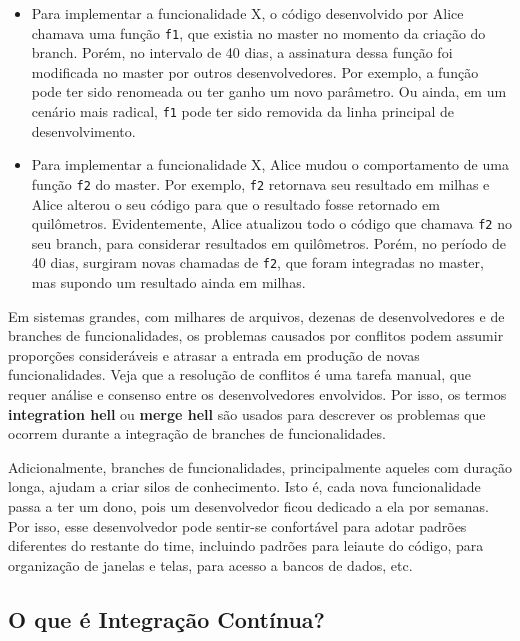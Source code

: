 \documentclass[
  11pt,
  twoside]{book}
\newcommand{\passthrough}[1]{#1}
\begin{document}
\begin{itemize}
\item
  Para implementar a funcionalidade X, o código desenvolvido por Alice
  chamava uma função \passthrough{\lstinline!f1!}, que existia no master
  no momento da criação do branch. Porém, no intervalo de 40 dias, a
  assinatura dessa função foi modificada no master por outros
  desenvolvedores. Por exemplo, a função pode ter sido renomeada ou ter
  ganho um novo parâmetro. Ou ainda, em um cenário mais radical,
  \passthrough{\lstinline!f1!} pode ter sido removida da linha principal
  de desenvolvimento.
\item
  Para implementar a funcionalidade X, Alice mudou o comportamento de
  uma função \passthrough{\lstinline!f2!} do master. Por exemplo,
  \passthrough{\lstinline!f2!} retornava seu resultado em milhas e Alice
  alterou o seu código para que o resultado fosse retornado em
  quilômetros. Evidentemente, Alice atualizou todo o código que chamava
  \passthrough{\lstinline!f2!} no seu branch, para considerar resultados
  em quilômetros. Porém, no período de 40 dias, surgiram novas chamadas
  de \passthrough{\lstinline!f2!}, que foram integradas no master, mas
  supondo um resultado ainda em milhas.
\end{itemize}

  Em sistemas grandes, com
milhares de arquivos, dezenas de desenvolvedores e de branches de
funcionalidades, os problemas causados por conflitos podem assumir
proporções consideráveis e atrasar a entrada em produção de novas
funcionalidades. Veja que a resolução de conflitos é uma tarefa manual,
que requer análise e consenso entre os desenvolvedores envolvidos. Por
isso, os termos \textbf{integration hell} ou \textbf{merge hell} são
usados para descrever os problemas que ocorrem durante a integração de
branches de funcionalidades.

Adicionalmente, branches de funcionalidades, principalmente aqueles com
duração longa, ajudam a criar silos de conhecimento. Isto é, cada nova
funcionalidade passa a ter um dono, pois um desenvolvedor ficou dedicado
a ela por semanas. Por isso, esse desenvolvedor pode sentir-se
confortável para adotar padrões diferentes do restante do time,
incluindo padrões para leiaute do código, para organização de janelas e
telas, para acesso a bancos de dados, etc.

\hypertarget{o-que-uxe9-integrauxe7uxe3o-contuxednua}{%
\subsection{O que é Integração
Contínua?}\label{o-que-uxe9-integrauxe7uxe3o-contuxednua}}
\end{document}
